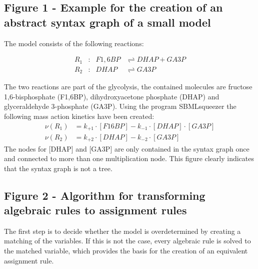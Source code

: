 \documentclass[10pt]{bmc_article}
\newenvironment{bmcformat}{\baselineskip20pt\sloppy\setboolean{publ}{false}}{\baselineskip20pt\sloppy}
\begin{document}
\begin{bmcformat}
\subsection*{Figure 1 - Example for the creation of an abstract syntax graph of a small model}
The model consists of the following reactions:
\begin{center}
\parbox[c]{.35\textwidth}{\begin{align*}
R_{1}&:& F1,6BP &\rightleftharpoons DHAP + GA3P\\
R_{2}&:& DHAP   &\rightleftharpoons GA3P
\end{align*}}
\end{center}
The two reactions are part of the glycolysis, the contained molecules are fructose 1,6-bisphosphate (F1,6BP),
dihydroxyacetone phosphate (DHAP) and glyceraldehyde 3-phosphate (GA3P).
Using the program SBMLsqueezer \cite{Draeger2008} the following mass action kinetics have been created:
\begin{align*}
\nu(R_{1}) &= k_{+1} \cdot [F16BP] - k_{-1} \cdot[DHAP] \cdot [GA3P]\\
\nu(R_{2}) &= k_{+2} \cdot [DHAP]  - k_{-2} \cdot[GA3P]
\end{align*}
The nodes for [DHAP] and [GA3P] are only contained in the syntax graph once and connected to more than one multiplication node.
This figure clearly indicates that the syntax graph is not a tree.

\subsection*{Figure 2 - Algorithm for transforming algebraic rules to assignment rules}
The first step is to decide whether the model is overdetermined by creating a matching of the variables.
If this is not the case, every algebraic rule is solved to the matched variable,
which provides the basis for the creation of an equivalent assignment rule.


\end{bmcformat}
\end{document}
